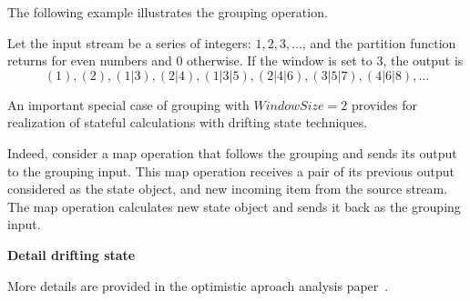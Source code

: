 The following example illustrates the grouping operation. 

Let the input stream be a series of integers: $ 1,2,3, \ldots$, and the  partition function returns for even numbers and 0 otherwise. If the window is set to 3, the output is 
$$(1), (2), (1|3), (2|4), (1|3|5), (2|4|6), (3|5|7), (4|6|8), \ldots$$

An important special case of grouping with $Window Size = 2$  provides for realization of stateful calculations with drifting state techniques.  

Indeed, consider a map operation that follows the grouping and sends its output to the grouping input. This map operation receives a pair of its previous output considered as the state object, and new incoming item from the source stream. The map operation calculates new state object and sends it back as the grouping input. 

{\bf Detail drifting state}

More details are provided in the optimistic aproach analysis paper~\cite{we2018seim}.
